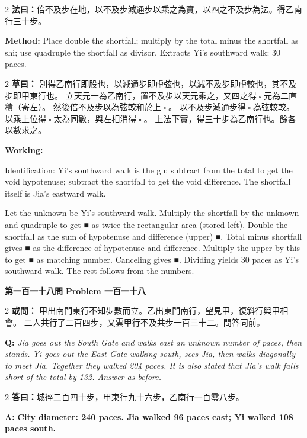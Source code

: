 \documentclass[11pt,a4paper]{article}
\let\origsquare\square
\renewcommand{\square}{\ensuremath{\origsquare}}%
\newcommand{\wen}[1]{%
  \par\vspace{0.5em}%
  \noindent\textcolor{problemcolor}{\textbf{第#1問}}%
  \hfill\textcolor{problemcolor}{\textbf{Problem #1}}\par\nopagebreak%
  \vspace{0.3em}%
}
\newcommand{\owen}[1]{%
  \noindent\textcolor{problemcolor}{\textbf{或問：}}{\tradfont #1}\par\nopagebreak%
}
\newcommand{\oweneng}[1]{%
  \noindent\textcolor{engcolor}{\textbf{Q: }}{\itshape #1}\par\nopagebreak%
}
\newcommand{\fayue}[1]{%
  \noindent\textcolor{methodcolor}{\textbf{法曰：}}{\tradfont #1}\par\nopagebreak%
}
\newcommand{\fayueeng}[1]{%
  \noindent\textcolor{engcolor}{\textbf{Method: }}{#1}\par\nopagebreak%
}
\newcommand{\tsaoyue}[1]{%
  \noindent\textcolor{workcolor}{\textbf{草曰：}}{\tradfont #1}\par%
}
\newcommand{\tsaoyueeng}[1]{%
  \noindent\textcolor{engcolor}{\textbf{Working: }}{\small #1}\par%
}
\newcommand{\dayue}[1]{%
  \noindent\textcolor{anscolor}{\textbf{答曰：}}{\tradfont #1}\par\nopagebreak%
}
\newcommand{\dayueeng}[1]{%
  \noindent\textcolor{engcolor}{\textbf{A: }}{\bfseries #1}\par\nopagebreak%
}
\begin{document}
\begin{paracol}{2}
\fayue{倍不及步在地，以不及步減通步以乘之為實，以四之不及步為法。得乙南行三十步。}
\switchcolumn
\fayueeng{Place double the shortfall; multiply by the total minus the shortfall as shi; use quadruple the shortfall as divisor. Extracts Yi's southward walk: 30 paces.}
\end{paracol}

\begin{paracol}{2}
\tsaoyue{%
別得乙南行即股也，以減通步即虛弦也，以減不及步即虛較也，其不及步即甲東行也。
立天元一為乙南行，置不及步以天元乘之，又四之得$ \; \square \; $元為二直積（寄左）。
然後倍不及步以為弦較和於上$ \; \square \; $。
以不及步減通步得$ \; \square \; $為弦較較。
以乘上位得$ \; \square \; $太為同數，與左相消得$ \; \square \; $。
上法下實，得三十步為乙南行也。餘各以數求之。}
\switchcolumn
\tsaoyueeng{%
Identification: Yi's southward walk is the gu; subtract from the total to get the void hypotenuse; subtract the shortfall to get the void difference. The shortfall itself is Jia's eastward walk.

Let the unknown be Yi's southward walk. Multiply the shortfall by the unknown and quadruple to get ■ as twice the rectangular area (stored left). Double the shortfall as the sum of hypotenuse and difference (upper) ■. Total minus shortfall gives ■ as the difference of hypotenuse and difference. Multiply the upper by this to get ■ as matching number. Canceling gives ■. Dividing yields 30 paces as Yi's southward walk. The rest follows from the numbers.}
\end{paracol}

\vspace{0.5cm}

\wen{一百一十八}

\begin{paracol}{2}
\owen{%
甲出南門東行不知步數而立。乙出東門南行，望見甲，復斜行與甲相會。
二人共行了二百四步，又雲甲行不及共步一百三十二。問答同前。}
\switchcolumn
\oweneng{%
Jia goes out the South Gate and walks east an unknown number of paces, then stands. Yi goes out the East Gate walking south, sees Jia, then walks diagonally to meet Jia. Together they walked 204 paces. It is also stated that Jia's walk falls short of the total by 132. Answer as before.}
\end{paracol}

\begin{paracol}{2}
\dayue{城徑二百四十步，甲東行九十六步，乙南行一百零八步。}
\switchcolumn
\dayueeng{City diameter: 240 paces. Jia walked 96 paces east; Yi walked 108 paces south.}
\end{paracol}
\end{document}
